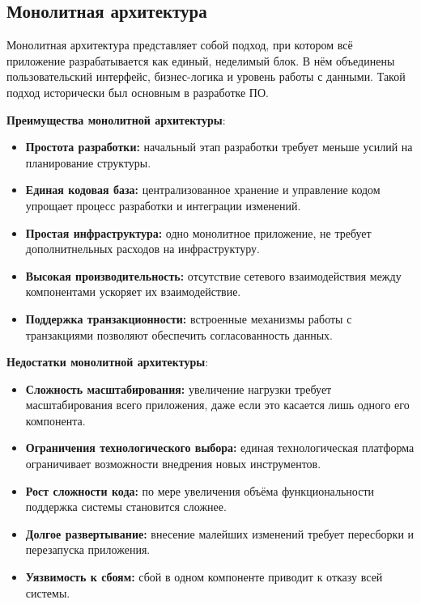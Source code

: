 \subsection{Монолитная архитектура}

Монолитная архитектура представляет собой подход, при котором всё приложение разрабатывается как единый, неделимый блок\cite{vernon2022strategic}. В нём объединены пользовательский интерфейс, бизнес-логика и уровень работы с данными. Такой подход исторически был основным в разработке ПО.

\textbf{Преимущества монолитной архитектуры}:
\begin{itemize}
    \item \textbf{Простота разработки:} начальный этап разработки требует меньше усилий на планирование структуры.
    \item \textbf{Единая кодовая база:} централизованное хранение и управление кодом упрощает процесс разработки и интеграции изменений.
    \item \textbf{Простая инфраструктура:} одно монолитное приложение, не требует дополнитнельных расходов на инфраструктуру.
    \item \textbf{Высокая производительность:} отсутствие сетевого взаимодействия между компонентами ускоряет их взаимодействие.
    \item \textbf{Поддержка транзакционности:} встроенные механизмы работы с транзакциями позволяют обеспечить согласованность данных.
\end{itemize}

\textbf{Недостатки монолитной архитектуры}:
\begin{itemize}
    \item \textbf{Сложность масштабирования:} увеличение нагрузки требует масштабирования всего приложения, даже если это касается лишь одного его компонента.
    \item \textbf{Ограничения технологического выбора:} единая технологическая платформа ограничивает возможности внедрения новых инструментов.
    \item \textbf{Рост сложности кода:} по мере увеличения объёма функциональности поддержка системы становится сложнее.\cite{al-debagy2019review}
    \item \textbf{Долгое развертывание:} внесение малейших изменений требует пересборки и перезапуска приложения.
    \item \textbf{Уязвимость к сбоям:} сбой в одном компоненте приводит к отказу всей системы.
\end{itemize}


